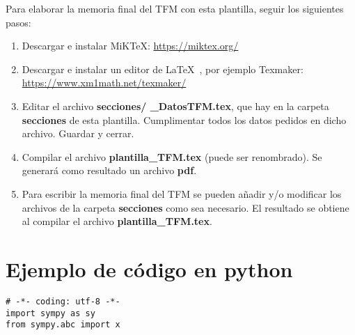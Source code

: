 \vspace*{1.5cm}
Para elaborar la memoria final del TFM con esta plantilla, seguir los siguientes pasos:
\begin{enumerate}
\item Descargar e instalar MiKTeX:  \url{https://miktex.org/}
\item Descargar e instalar un editor de \LaTeX~, por ejemplo Texmaker:\\
\url{https://www.xm1math.net/texmaker/}

\item Editar el archivo \textbf{secciones/ \_DatosTFM.tex}, que hay en la carpeta \textbf{secciones} de esta plantilla. Cumplimentar todos los datos pedidos en dicho archivo. Guardar y cerrar.
\item Compilar el archivo \textbf{plantilla\_TFM.tex} (puede ser renombrado). Se generará como resultado un archivo \textbf{pdf}.
\item Para escribir la memoria final del TFM se pueden añadir y/o modificar los archivos de la carpeta \textbf{secciones} como sea necesario. El resultado se obtiene al compilar el archivo \textbf{plantilla\_TFM.tex}. 
\end{enumerate}


\section{Ejemplo de código en python}
\begin{lstlisting}[style=Python]
# -*- coding: utf-8 -*-
import sympy as sy
from sympy.abc import x
\end{lstlisting}
